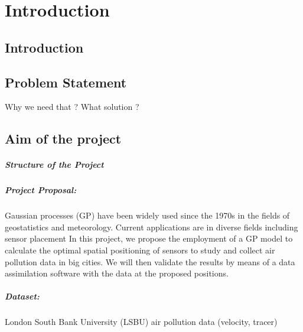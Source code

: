 \chapter{Introduction}

\section{Introduction}

\section{Problem Statement}

Why we need that ? What solution ?

\section{Aim of the project }


\paragraph{Structure of the Project}





\paragraph{Project Proposal:}
Gaussian processes (GP) have been widely used since the 1970s in the fields of geostatistics and meteorology. Current applications are in diverse fields including sensor placement
In this project, we propose the employment of a GP model to calculate the optimal spatial positioning of sensors to study and collect air pollution data in big cities. We will then validate the results by means of a data assimilation software with the data at the proposed positions.

\paragraph{Dataset:} London South Bank University (LSBU) air pollution data (velocity, tracer)


